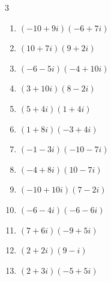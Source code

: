 \begin{multicols}{3}
\begin{enumerate}
        \phantom{$\displaystyle =6-22i$}

  \item $\displaystyle (-10+9i)(-6+7i)$

        \phantom{$\displaystyle =-3-124i$}

  \item $\displaystyle (10+7i)(9+2i)$

        \phantom{$\displaystyle =76+83i$}

  \item $\displaystyle (-6-5i)(-4+10i)$

        \phantom{$\displaystyle =74-40i$}

  \item $\displaystyle (3+10i)(8-2i)$

        \phantom{$\displaystyle =44+74i$}

  \item $\displaystyle (5+4i)(1+4i)$

        \phantom{$\displaystyle =-11+24i$}

  \item $\displaystyle (1+8i)(-3+4i)$

        \phantom{$\displaystyle =-35-20i$}

  \item $\displaystyle (-1-3i)(-10-7i)$

        \phantom{$\displaystyle =-11+37i$}

  \item $\displaystyle (-4+8i)(10-7i)$

        \phantom{$\displaystyle =16+108i$}

  \item $\displaystyle (-10+10i)(7-2i)$

        \phantom{$\displaystyle =-50+90i$}

  \item $\displaystyle (-6-4i)(-6-6i)$

        \phantom{$\displaystyle =12+60i$}

  \item $\displaystyle (7+6i)(-9+5i)$

        \phantom{$\displaystyle =-93-19i$}

  \item $\displaystyle (2+2i)(9-i)$

        \phantom{$\displaystyle =20+16i$}

\columnbreak %

  \item $\displaystyle (2+3i)(-5+5i)$


\end{enumerate}
\end{multicols}
